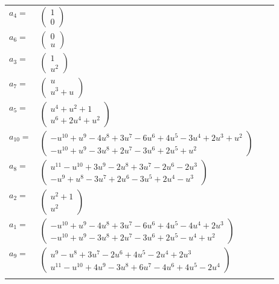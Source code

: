\documentclass[1p]{elsarticle_modified}
\theoremstyle{definition}
\begin{document}
\begin{tabular}{m{7pt} m{180pt} m{7pt} m{180pt} }
\flushright $a_{4}=$&$\begin{pmatrix}1\\0\end{pmatrix}$ \\
\flushright $a_{6}=$&$\begin{pmatrix}0\\u\end{pmatrix}$ \\
\flushright $a_{3}=$&$\begin{pmatrix}1\\u^2\end{pmatrix}$ \\
\flushright $a_{7}=$&$\begin{pmatrix}u\\u^3+u\end{pmatrix}$ \\
\flushright $a_{5}=$&$\begin{pmatrix}u^4+u^2+1\\u^6+2 u^4+u^2\end{pmatrix}$ \\
\flushright $a_{10}=$&$\begin{pmatrix}- u^{10}+u^9-4 u^8+3 u^7-6 u^6+4 u^5-3 u^4+2 u^3+u^2\\- u^{10}+u^9-3 u^8+2 u^7-3 u^6+2 u^5+u^2\end{pmatrix}$ \\
\flushright $a_{8}=$&$\begin{pmatrix}u^{11}- u^{10}+3 u^9-2 u^8+3 u^7-2 u^6-2 u^3\\- u^9+u^8-3 u^7+2 u^6-3 u^5+2 u^4- u^3\end{pmatrix}$ \\
\flushright $a_{2}=$&$\begin{pmatrix}u^2+1\\u^2\end{pmatrix}$ \\
\flushright $a_{1}=$&$\begin{pmatrix}- u^{10}+u^9-4 u^8+3 u^7-6 u^6+4 u^5-4 u^4+2 u^3\\- u^{10}+u^9-3 u^8+2 u^7-3 u^6+2 u^5- u^4+u^2\end{pmatrix}$ \\
\flushright $a_{9}=$&$\begin{pmatrix}u^9- u^8+3 u^7-2 u^6+4 u^5-2 u^4+2 u^3\\u^{11}- u^{10}+4 u^9-3 u^8+6 u^7-4 u^6+4 u^5-2 u^4\end{pmatrix}$\\&\end{tabular}
\end{document}

